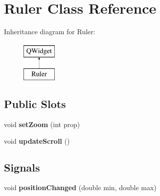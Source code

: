 \hypertarget{class_ruler}{\section{Ruler Class Reference}
\label{class_ruler}
}
Inheritance diagram for Ruler\-:\begin{figure}[H]
\begin{center}
\leavevmode
\includegraphics[height=2.000000cm]{class_ruler}
\end{center}
\end{figure}
\subsection*{Public Slots}
\begin{DoxyCompactItemize}
\item 
\hypertarget{class_ruler_abdf992b5a6463f585f1a26ea2cc2831b}{void {\bfseries set\-Zoom} (int prop)}\label{class_ruler_abdf992b5a6463f585f1a26ea2cc2831b}

\item 
\hypertarget{class_ruler_ae72f1249e94ab561c1e4c116245017e9}{void {\bfseries update\-Scroll} ()}\label{class_ruler_ae72f1249e94ab561c1e4c116245017e9}

\end{DoxyCompactItemize}
\subsection*{Signals}
\begin{DoxyCompactItemize}
\item 
\hypertarget{class_ruler_a05d0726ea0344b2a06a1fe83428520f7}{void {\bfseries position\-Changed} (double min, double max)}\label{class_ruler_a05d0726ea0344b2a06a1fe83428520f7}

\end{DoxyCompactItemize}
